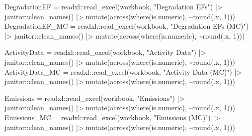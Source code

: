 \documentclass[
]{article}
\newenvironment{Shaded}{}{}
\newcommand{\DecValTok}[1]{\textcolor[rgb]{0.25,0.63,0.44}{#1}}
\newcommand{\FunctionTok}[1]{\textcolor[rgb]{0.02,0.16,0.49}{#1}}
\newcommand{\NormalTok}[1]{#1}
\newcommand{\OtherTok}[1]{\textcolor[rgb]{0.00,0.44,0.13}{#1}}
\newcommand{\SpecialCharTok}[1]{\textcolor[rgb]{0.25,0.44,0.63}{#1}}
\newcommand{\StringTok}[1]{\textcolor[rgb]{0.25,0.44,0.63}{#1}}
\begin{document}
\begin{Shaded}
\begin{Highlighting}[numbers=left,,]
\NormalTok{DegradationEF }\OtherTok{=}\NormalTok{ readxl}\SpecialCharTok{::}\FunctionTok{read\_excel}\NormalTok{(workbook, }\StringTok{"Degradation EFs"}\NormalTok{) }\SpecialCharTok{|\textgreater{}}
\NormalTok{    janitor}\SpecialCharTok{::}\FunctionTok{clean\_names}\NormalTok{() }\SpecialCharTok{|\textgreater{}}
    \FunctionTok{mutate}\NormalTok{(}\FunctionTok{across}\NormalTok{(}\FunctionTok{where}\NormalTok{(is.numeric), }\SpecialCharTok{\textasciitilde{}}\FunctionTok{round}\NormalTok{(.x, }\DecValTok{1}\NormalTok{)))}
\NormalTok{DegradationEF\_MC }\OtherTok{=}\NormalTok{ readxl}\SpecialCharTok{::}\FunctionTok{read\_excel}\NormalTok{(workbook, }\StringTok{"Degradation EFs (MC)"}\NormalTok{) }\SpecialCharTok{|\textgreater{}}
\NormalTok{    janitor}\SpecialCharTok{::}\FunctionTok{clean\_names}\NormalTok{() }\SpecialCharTok{|\textgreater{}}
    \FunctionTok{mutate}\NormalTok{(}\FunctionTok{across}\NormalTok{(}\FunctionTok{where}\NormalTok{(is.numeric), }\SpecialCharTok{\textasciitilde{}}\FunctionTok{round}\NormalTok{(.x, }\DecValTok{1}\NormalTok{)))}

\NormalTok{ActivityData }\OtherTok{=}\NormalTok{ readxl}\SpecialCharTok{::}\FunctionTok{read\_excel}\NormalTok{(workbook, }\StringTok{"Activity Data"}\NormalTok{) }\SpecialCharTok{|\textgreater{}}
\NormalTok{    janitor}\SpecialCharTok{::}\FunctionTok{clean\_names}\NormalTok{() }\SpecialCharTok{|\textgreater{}}
    \FunctionTok{mutate}\NormalTok{(}\FunctionTok{across}\NormalTok{(}\FunctionTok{where}\NormalTok{(is.numeric), }\SpecialCharTok{\textasciitilde{}}\FunctionTok{round}\NormalTok{(.x, }\DecValTok{1}\NormalTok{)))}
\NormalTok{ActivityData\_MC }\OtherTok{=}\NormalTok{ readxl}\SpecialCharTok{::}\FunctionTok{read\_excel}\NormalTok{(workbook, }\StringTok{"Activity Data (MC)"}\NormalTok{) }\SpecialCharTok{|\textgreater{}}
\NormalTok{    janitor}\SpecialCharTok{::}\FunctionTok{clean\_names}\NormalTok{() }\SpecialCharTok{|\textgreater{}}
    \FunctionTok{mutate}\NormalTok{(}\FunctionTok{across}\NormalTok{(}\FunctionTok{where}\NormalTok{(is.numeric), }\SpecialCharTok{\textasciitilde{}}\FunctionTok{round}\NormalTok{(.x, }\DecValTok{1}\NormalTok{)))}

\NormalTok{Emissions }\OtherTok{=}\NormalTok{ readxl}\SpecialCharTok{::}\FunctionTok{read\_excel}\NormalTok{(workbook, }\StringTok{"Emissions"}\NormalTok{) }\SpecialCharTok{|\textgreater{}}
\NormalTok{    janitor}\SpecialCharTok{::}\FunctionTok{clean\_names}\NormalTok{() }\SpecialCharTok{|\textgreater{}}
    \FunctionTok{mutate}\NormalTok{(}\FunctionTok{across}\NormalTok{(}\FunctionTok{where}\NormalTok{(is.numeric), }\SpecialCharTok{\textasciitilde{}}\FunctionTok{round}\NormalTok{(.x, }\DecValTok{1}\NormalTok{)))}
\NormalTok{Emissions\_MC }\OtherTok{=}\NormalTok{ readxl}\SpecialCharTok{::}\FunctionTok{read\_excel}\NormalTok{(workbook, }\StringTok{"Emissions (MC)"}\NormalTok{) }\SpecialCharTok{|\textgreater{}}
\NormalTok{    janitor}\SpecialCharTok{::}\FunctionTok{clean\_names}\NormalTok{() }\SpecialCharTok{|\textgreater{}}
    \FunctionTok{mutate}\NormalTok{(}\FunctionTok{across}\NormalTok{(}\FunctionTok{where}\NormalTok{(is.numeric), }\SpecialCharTok{\textasciitilde{}}\FunctionTok{round}\NormalTok{(.x, }\DecValTok{1}\NormalTok{)))}


\end{Highlighting}
\end{Shaded}
\end{document}

